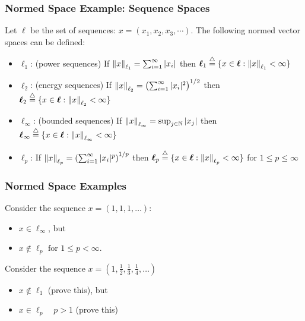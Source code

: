 \documentclass{beamer}
\begin{document}
\begin{frame}\frametitle{Normed Space Example: Sequence Spaces}
Let $\boldsymbol{\ell}$ be the set of sequences: $x = (x_1, x_2, x_3, \cdots)$.  
The following normed vector spaces can be defined:
\begin{itemize}
\item $\boldsymbol{\ell}_1$: (power sequences)  If $\left\| x\right\|_{\ell_1} = \sum_{i=1}^{\infty}|x_i|$ then 
$\boldsymbol{\ell}_1 \stackrel{\triangle}{=} \{x \in \boldsymbol{\ell} : \left\|x\right\|_{\ell_1} < \infty \}$
\item $\boldsymbol{\ell}_2$: (energy sequences)  If $\left\| x\right\|_{\ell_2} = \left(\sum_{i=1}^{\infty}|x_i|^2\right)^{1/2}$ then $\boldsymbol{\ell}_2 \stackrel{\triangle}{=} \{x \in \boldsymbol{\ell} : \left\|x\right\|_{\ell_2} < \infty \}$
\item $\boldsymbol{\ell}_\infty$: (bounded sequences)  If $\left\| x\right\|_{\ell_\infty} = \sup_{j\in\mathbb{N}}|x_j|$ then $\boldsymbol{\ell}_\infty \stackrel{\triangle}{=} \{x \in \boldsymbol{\ell} : \left\|x\right\|_{\ell_\infty} < \infty \}$
\item $\boldsymbol{\ell}_p$:  If $\left\| x\right\|_{\ell_p} = \left(\sum_{i=1}^{\infty}|x_i|^p\right)^{1/p}$ then $\boldsymbol{\ell}_p \stackrel{\triangle}{=} \{x \in \boldsymbol{\ell} : \left\|x\right\|_{\ell_p} < \infty \}$ for $1\leq p \leq\infty$
\end{itemize}
\end{frame}

\begin{frame}\frametitle{Normed Space Examples}

\begin{example}
Consider the sequence $x = (1,1,1,\ldots)$:
\begin{itemize}
\item $x \in \boldsymbol{\ell}_{\infty}$, but
\item $x \notin \boldsymbol{\ell}_p \text{ for } 1 \leq p < \infty$.
\end{itemize}
\end{example}

\begin{example}
Consider the sequence $x = (1, \frac{1}{2}, \frac{1}{3}, \frac{1}{4}, \ldots)$
\begin{itemize}
\item 	$x \notin \boldsymbol{\ell}_1$ (prove this), but 
\item $x \in \boldsymbol{\ell}_p \quad p > 1$ (prove this)
\end{itemize}
\end{example}
\end{frame}
\end{document}
